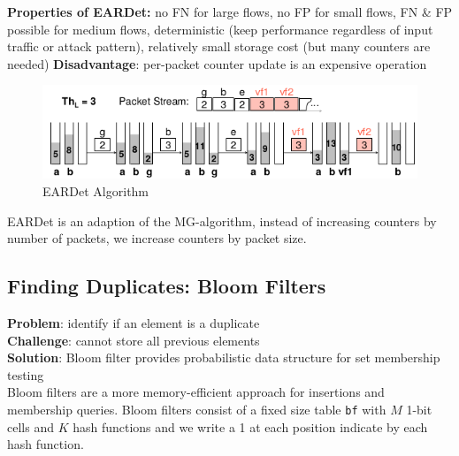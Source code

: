 \documentclass[11pt,oneside,a4paper]{article}
\begin{document}
\textbf{Properties of EARDet:} no FN for large flows, no FP for small flows, FN \& FP possible for medium flows, deterministic (keep performance regardless of input traffic or attack pattern), relatively small storage cost (but many counters are needed)
\textbf{Disadvantage}: per-packet counter update is an expensive operation

\newpage

\begin{figure}[t!]
	\centering
	\includegraphics[width=0.5\linewidth]{figures/eardet_algorithm}
	\caption{EARDet Algorithm}
	\label{fig:eardetalgorithm}
\end{figure}

EARDet is an adaption of the MG-algorithm, instead of increasing counters by number of packets, we increase counters by packet size.

\subsection{Finding Duplicates: Bloom Filters}

\textbf{Problem}: identify if an element is a duplicate\\
\textbf{Challenge}: cannot store all previous elements\\
\textbf{Solution}: Bloom filter provides probabilistic data structure for set membership testing\\

Bloom filters are a more memory-efficient approach for insertions and membership queries. Bloom filters consist of a fixed size table \texttt{bf} with $M$ 1-bit cells and $K$ hash functions and we write a 1 at each position indicate by each hash function.
\end{document}
